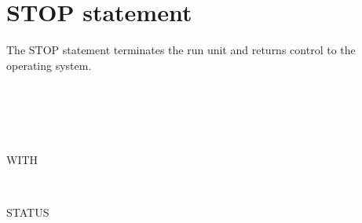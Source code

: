 \section{STOP statement}

The STOP statement terminates the run unit and returns control to the operating system.


\begin{syntax}
   
  \begin{0-1}
    \begin{1=}
       \\
    \end{1=}
    \begin{1=}
      \identifier \\
      \literal
    \end{1=} \\

    WITH
    \begin{1=}
       \\
    \end{1=}
    STATUS
    \begin{0-1}
      \identifier \\
      \literal
    \end{0-1}
  \end{0-1}
\end{syntax}


\begin{syntax}[\deletedcolour]
   \literal
\end{syntax}


\begin{syntax}[\miscextcolour]
   \identifier
\end{syntax}


\begin{syntax}[\miscextcolour]
   
  \begin{1=}
    \identifier \\
    \literal
  \end{1=}
\end{syntax}


\begin{syntax}[\miscextcolour]
\end{syntax}

